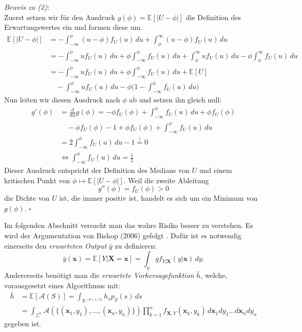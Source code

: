 \textit{Beweis zu (2)}: \\
Zuerst setzen wir f\"ur den Ausdruck $g(\phi) = \mathbb{E}[|U-\phi|]$ die Definition des Erwartungswertes ein und formen diese um.
\begin{equation*}
	\begin{split}
		\mathbb{E}[|U-\phi|]  & = -\int_{-\infty}^{\phi}(u-\phi)f_U(u)  \,du + \int_{\phi}^{\infty}(u-\phi)f_U(u)  \,du \\\
		& = - \int_{-\infty}^{\phi}uf_U(u)  \,du + \phi \int_{-\infty}^{\phi}f_U(u)  \,du + \int_{\phi}^{\infty}uf_U(u)  \,du -\phi \int_{\phi}^{\infty}f_U(u)  \,du \\\
		& = - \int_{-\infty}^{\phi}uf_U(u) \,du + \phi \int_{-\infty}^{\phi}f_U(u) \,du + \mathbb{E}[U] \\\
		& \quad - \int_{-\infty}^{\phi}uf_U(u) \,du - \phi \bigl(1 - \int_{-\infty}^{\phi}f_U(u) \,du \bigr)
	\end{split}
\end{equation*}
Nun leiten wir diesen Ausdruck nach $\phi$ ab und setzen ihn gleich null:
\begin{equation*}
	\begin{split}
		g'(\phi) & = \frac{d}{d\phi}g(\phi) = -\phi f_U(\phi) + \int_{-\infty}^{\phi}f_U(u) \,du + \phi f_U(\phi) \\\
		& \quad - \phi f_U(\phi) - 1 + \phi f_U(\phi) + \int_{-\infty}^{\phi}f_U(u) \,du \\\
		& = 2\int_{-\infty}^{\phi}f_U(u) \,du - 1 \overset{!}{=} 0 \\\
		& \Leftrightarrow \int_{-\infty}^{\phi}f_U(u) \,du = \frac{1}{2}
	\end{split}
\end{equation*}
Dieser Ausdruck entspricht der Definition des Medians von $U$ und einem kritischen Punkt von $\phi \mapsto \mathbb{E}[|U - \phi|]$. Weil die zweite Ableitung
$$ g''(\phi) = f_U(\phi) > 0 $$
die Dichte von $U$ ist, die immer positiv ist, handelt es sich um ein Minimum von $g(\phi)$. $\square$

Im folgenden Abschnitt versucht man das wahre Risiko besser zu verstehen. Es wird der Argumentation von Bishop (2006) gefolgt \cite[Seiten 147 bis 152]{bishop}.
Daf\"ur ist es notwendig einerseits den \textit{erwarteten Output} $\bar{y}$ zu definieren:
$$ \bar{y}(\mathbf{x}) = \mathbb{E}[Y|\mathbf{X}=\mathbf{x}] = \int_y y f_{Y|\mathbf{X}}(y|\mathbf{x}) \, dy.$$
Andererseits ben\"otigt man die \textit{erwartete Vorhersagefunktion} $\bar{h}$, welche, vorausgesetzt eines Algorithmus mit:
\begin{equation*}
	\begin{split}
		\bar{h} & = \mathbb{E}[\mathcal{A}(S)] = \int_{\mathbb{R}^{(d+1)n}} h_s p_S(s)  \,ds  \\\
		& = \int_{\mathcal{Z}^n}\mathcal{A}(\{ (\mathbf{x}_1, y_1), \dots ,(\mathbf{x}_n, y_n)\}) \prod_{k=1}^n f_{\mathbf{X},Y}(\mathbf{x}_k, y_k) \, d\mathbf{x}_1 dy_1 \dots d\mathbf{x}_n dy_n
	\end{split}
\end{equation*}
gegeben ist.

